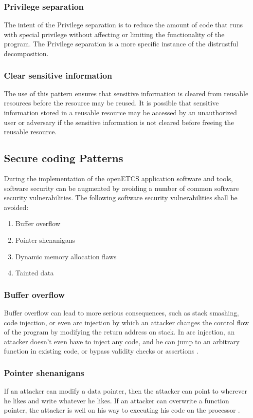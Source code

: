 \documentclass{template/openetcs_report}
\begin{document}
\subsubsection{Privilege separation}
The intent of the Privilege separation is to reduce the amount of code that runs with special privilege without affecting or limiting the functionality of the program. The Privilege separation is a more specific instance of the distrustful decomposition.
\subsubsection{Clear sensitive information}
The use of this pattern ensures that sensitive information is cleared from reusable resources before the resource may be reused. It is possible that sensitive information stored in a reusable resource may be accessed by an unauthorized user or adversary if the sensitive information is not cleared before freeing the reusable resource.


\subsection{Secure coding Patterns}
\label{CPatterns1}
During the implementation of the openETCS application software and tools, software security can be augmented by avoiding a number of common software security vulnerabilities. 
The following software security vulnerabilities shall be avoided:
\begin{enumerate}
  \item Buffer overflow
  \item Pointer shenanigans
  \item Dynamic memory allocation flaws
  \item Tainted data
\end{enumerate}
\subsubsection{Buffer overflow}
Buffer overflow can lead to more serious consequences, such as stack smashing, code injection, or even arc injection by which an attacker changes the control flow of the program by modifying the return address on stack. In arc injection, an attacker doesn't even have to inject any code, and he can jump to an arbitrary function in existing code, or bypass validity checks or assertions \cite{Kalinsky09}.
\subsubsection{Pointer shenanigans}
If an attacker can modify a data pointer, then the attacker can point to wherever he likes and write whatever he likes. If an attacker can overwrite a function pointer, the attacker is well on his way to executing his code on the processor \cite{Kalinsky09}.
\end{document}
